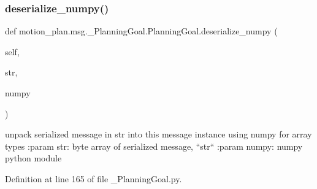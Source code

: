 \subsubsection{\texorpdfstring{deserialize\+\_\+numpy()}{deserialize\_numpy()}}
{\footnotesize\ttfamily def motion\+\_\+plan.\+msg.\+\_\+\+Planning\+Goal.\+Planning\+Goal.\+deserialize\+\_\+numpy (\begin{DoxyParamCaption}\item[{}]{self,  }\item[{}]{str,  }\item[{}]{numpy }\end{DoxyParamCaption})}

\begin{DoxyVerb}unpack serialized message in str into this message instance using numpy for array types
:param str: byte array of serialized message, ``str``
:param numpy: numpy python module
\end{DoxyVerb}
 

Definition at line 165 of file \+\_\+\+Planning\+Goal.\+py.


